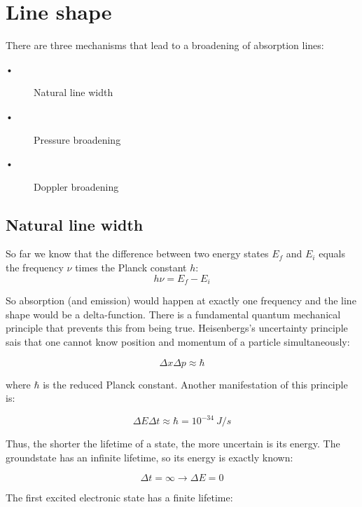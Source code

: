\section{Line shape}
\label{sec:line_shape}

There are three mechanisms that lead to a broadening of absorption lines:
\begin{description}
\item[•] Natural line width
\item[•] Pressure broadening
\item[•] Doppler broadening 
\end{description}

\subsection{Natural line width}

So far we know that the difference between two energy states $E_{f}$ and $E_{i}$ equals the frequency $\nu$ times the Planck constant $h$:
\begin{equation}
h \nu = E_f - E_i
\end{equation}

So absorption (and emission) would happen at exactly one frequency and the line shape would be a delta-function. There is a fundamental quantum mechanical principle that prevents this from being true. Heisenbergs's uncertainty principle sais that one cannot know position and momentum of a particle simultaneously: 

\begin{equation}
\Delta x \Delta p \approx \hbar
\end{equation}

where $\hbar$ is the reduced Planck constant. Another manifestation of this principle is:

\begin{equation}
\Delta E \Delta t \approx \hbar = 10^{-34}~J/s
\end{equation}

Thus, the shorter the lifetime of a state, the more uncertain is its energy. 
The groundstate has an infinite lifetime, so its energy is exactly known:

\begin{equation}
\Delta t = \infty \rightarrow \Delta E = 0
\end{equation}

The first excited electronic state has a finite lifetime:

